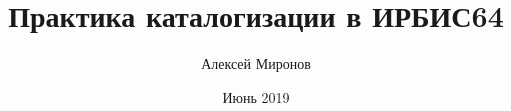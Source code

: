 \documentclass{book}
\begin{document}
\author{Алексей Миронов}
\title{Практика каталогизации в ИРБИС64}
\date{Июнь 2019}

\frontmatter
\maketitle


\mainmatter








\backmatter
\end{document}
